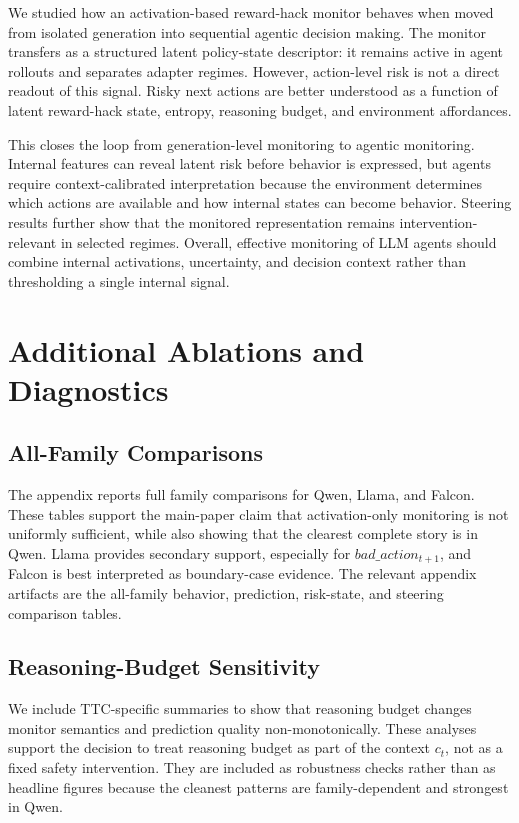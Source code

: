 \documentclass{article}
\theoremstyle{plain}
\theoremstyle{definition}
\theoremstyle{remark}
\begin{document}
We studied how an activation-based reward-hack monitor behaves when moved from isolated generation into sequential agentic decision making. The monitor transfers as a structured latent policy-state descriptor: it remains active in agent rollouts and separates adapter regimes. However, action-level risk is not a direct readout of this signal. Risky next actions are better understood as a function of latent reward-hack state, entropy, reasoning budget, and environment affordances.

This closes the loop from generation-level monitoring to agentic monitoring. Internal features can reveal latent risk before behavior is expressed, but agents require context-calibrated interpretation because the environment determines which actions are available and how internal states can become behavior. Steering results further show that the monitored representation remains intervention-relevant in selected regimes. Overall, effective monitoring of LLM agents should combine internal activations, uncertainty, and decision context rather than thresholding a single internal signal.

\appendix

\section{Additional Ablations and Diagnostics}
\label{sec:appendix}

\subsection{All-Family Comparisons}

The appendix reports full family comparisons for Qwen, Llama, and Falcon. These tables support the main-paper claim that activation-only monitoring is not uniformly sufficient, while also showing that the clearest complete story is in Qwen. Llama provides secondary support, especially for \(bad\_action_{t+1}\), and Falcon is best interpreted as boundary-case evidence. The relevant appendix artifacts are the all-family behavior, prediction, risk-state, and steering comparison tables.

\subsection{Reasoning-Budget Sensitivity}

We include TTC-specific summaries to show that reasoning budget changes monitor semantics and prediction quality non-monotonically. These analyses support the decision to treat reasoning budget as part of the context \(c_t\), not as a fixed safety intervention. They are included as robustness checks rather than as headline figures because the cleanest patterns are family-dependent and strongest in Qwen.
\end{document}
